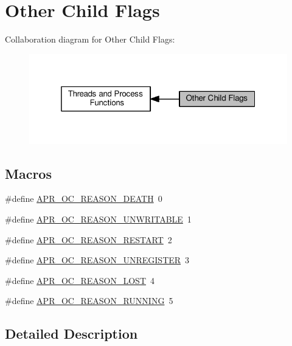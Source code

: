 \hypertarget{group__APR__OC}{}\section{Other Child Flags}
\label{group__APR__OC}
Collaboration diagram for Other Child Flags\+:
\nopagebreak
\begin{figure}[H]
\begin{center}
\leavevmode
\includegraphics[width=319pt]{group__APR__OC}
\end{center}
\end{figure}
\subsection*{Macros}
\begin{DoxyCompactItemize}
\item 
\#define \hyperlink{group__APR__OC_ga93a18b17cfedca0c7c99c696508c935b}{A\+P\+R\+\_\+\+O\+C\+\_\+\+R\+E\+A\+S\+O\+N\+\_\+\+D\+E\+A\+TH}~0
\item 
\#define \hyperlink{group__APR__OC_gae4cb4983512df7df00c9c0401efba9c9}{A\+P\+R\+\_\+\+O\+C\+\_\+\+R\+E\+A\+S\+O\+N\+\_\+\+U\+N\+W\+R\+I\+T\+A\+B\+LE}~1
\item 
\#define \hyperlink{group__APR__OC_ga5ae054b0b4c7c8eea911c146ae9ccdce}{A\+P\+R\+\_\+\+O\+C\+\_\+\+R\+E\+A\+S\+O\+N\+\_\+\+R\+E\+S\+T\+A\+RT}~2
\item 
\#define \hyperlink{group__APR__OC_ga7fe88662b788e07800290f68575b2f4b}{A\+P\+R\+\_\+\+O\+C\+\_\+\+R\+E\+A\+S\+O\+N\+\_\+\+U\+N\+R\+E\+G\+I\+S\+T\+ER}~3
\item 
\#define \hyperlink{group__APR__OC_ga5d441798b20b93bd1f609264d03690fb}{A\+P\+R\+\_\+\+O\+C\+\_\+\+R\+E\+A\+S\+O\+N\+\_\+\+L\+O\+ST}~4
\item 
\#define \hyperlink{group__APR__OC_gaa4a7ca44f23d67e7e19fd59bf41abd6a}{A\+P\+R\+\_\+\+O\+C\+\_\+\+R\+E\+A\+S\+O\+N\+\_\+\+R\+U\+N\+N\+I\+NG}~5
\end{DoxyCompactItemize}


\subsection{Detailed Description}


